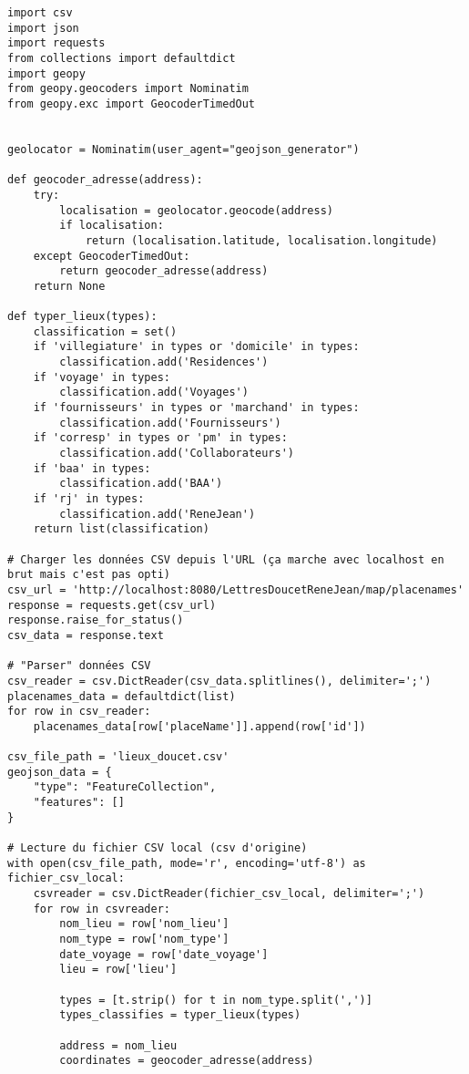 \begin{verbatim}
import csv
import json
import requests
from collections import defaultdict
import geopy
from geopy.geocoders import Nominatim
from geopy.exc import GeocoderTimedOut


geolocator = Nominatim(user_agent="geojson_generator")

def geocoder_adresse(address):
    try:
        localisation = geolocator.geocode(address)
        if localisation:
            return (localisation.latitude, localisation.longitude)
    except GeocoderTimedOut:
        return geocoder_adresse(address)
    return None

def typer_lieux(types):
    classification = set()
    if 'villegiature' in types or 'domicile' in types:
        classification.add('Residences')
    if 'voyage' in types:
        classification.add('Voyages')
    if 'fournisseurs' in types or 'marchand' in types:
        classification.add('Fournisseurs')
    if 'corresp' in types or 'pm' in types:
        classification.add('Collaborateurs')
    if 'baa' in types:
        classification.add('BAA')
    if 'rj' in types:
        classification.add('ReneJean')
    return list(classification)

# Charger les données CSV depuis l'URL (ça marche avec localhost en brut mais c'est pas opti)
csv_url = 'http://localhost:8080/LettresDoucetReneJean/map/placenames'
response = requests.get(csv_url)
response.raise_for_status()
csv_data = response.text

# "Parser" données CSV
csv_reader = csv.DictReader(csv_data.splitlines(), delimiter=';')
placenames_data = defaultdict(list)
for row in csv_reader:
    placenames_data[row['placeName']].append(row['id'])

csv_file_path = 'lieux_doucet.csv'
geojson_data = {
    "type": "FeatureCollection",
    "features": []
}

# Lecture du fichier CSV local (csv d'origine)
with open(csv_file_path, mode='r', encoding='utf-8') as fichier_csv_local:
    csvreader = csv.DictReader(fichier_csv_local, delimiter=';')
    for row in csvreader:
        nom_lieu = row['nom_lieu']
        nom_type = row['nom_type']
        date_voyage = row['date_voyage']
        lieu = row['lieu']

        types = [t.strip() for t in nom_type.split(',')]
        types_classifies = typer_lieux(types)
        
        address = nom_lieu
        coordinates = geocoder_adresse(address)
        

\end{verbatim}
